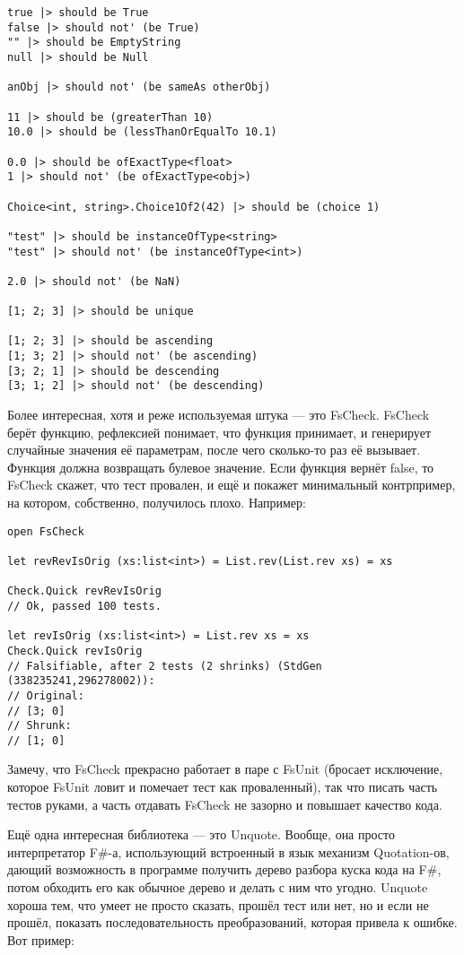 \documentclass[a5paper]{article}
\begin{document}
\begin{verbatim}
true |> should be True
false |> should not' (be True)
"" |> should be EmptyString
null |> should be Null

anObj |> should not' (be sameAs otherObj)

11 |> should be (greaterThan 10)
10.0 |> should be (lessThanOrEqualTo 10.1)

0.0 |> should be ofExactType<float>
1 |> should not' (be ofExactType<obj>)

Choice<int, string>.Choice1Of2(42) |> should be (choice 1)

"test" |> should be instanceOfType<string>
"test" |> should not' (be instanceOfType<int>)

2.0 |> should not' (be NaN)

[1; 2; 3] |> should be unique

[1; 2; 3] |> should be ascending
[1; 3; 2] |> should not' (be ascending)
[3; 2; 1] |> should be descending
[3; 1; 2] |> should not' (be descending)
\end{verbatim}

Более интересная, хотя и реже используемая штука --- это FsCheck. FsCheck берёт функцию, рефлексией понимает, что функция принимает, и генерирует случайные значения её параметрам, после чего сколько-то раз её вызывает. Функция должна возвращать булевое значение. Если функция вернёт false, то FsCheck скажет, что тест провален, и ещё и покажет минимальный контрпример, на котором, собственно, получилось плохо. Например: 

\begin{verbatim}
open FsCheck

let revRevIsOrig (xs:list<int>) = List.rev(List.rev xs) = xs

Check.Quick revRevIsOrig
// Ok, passed 100 tests.

let revIsOrig (xs:list<int>) = List.rev xs = xs
Check.Quick revIsOrig
// Falsifiable, after 2 tests (2 shrinks) (StdGen (338235241,296278002)):
// Original:
// [3; 0]
// Shrunk:
// [1; 0]
\end{verbatim}

Замечу, что FsCheck прекрасно работает в паре с FsUnit (бросает исключение, которое FsUnit ловит и помечает тест как проваленный), так что писать часть тестов руками, а часть отдавать FsCheck не зазорно и повышает качество кода.

Ещё одна интересная библиотека --- это Unquote. Вообще, она просто интерпретатор F\#-а, использующий встроенный в язык механизм Quotation-ов, дающий возможность в программе получить дерево разбора куска кода на F\#, потом обходить его как обычное дерево и делать с ним что угодно. Unquote хороша тем, что умеет не просто сказать, прошёл тест или нет, но и если не прошёл, показать последовательность преобразований, которая привела к ошибке. Вот пример:
\end{document}
